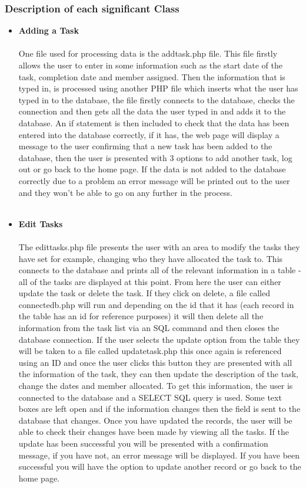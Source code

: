 \documentclass{project}
\begin{document}
\subsubsection{Description of each significant Class}
\begin{itemize}
\item \textbf{Adding a Task} \\~\\
One file used for processing data is the addtask.php file. This file firstly allows the user to enter in some information such as the start date of the task, completion date and member assigned. Then the information that is typed in, is processed using another PHP file which inserts what the user has typed in to the database, the file firstly connects to the database, checks the connection and then gets all the data the user typed in and adds it to the database. An if statement is then included to check that the data has been entered into the database correctly, if it has, the web page will display a message to the user confirming that a new task has been added to the database, then the user is presented with 3 options to add another task, log out or go back to the home page. If the data is not added to the database correctly due to a problem an error message will be printed out to the user and they won't be able to go on any further in the process. \\~\\
\item \textbf{Edit Tasks} \\~\\
The edittasks.php file presents the user with an area to modify the tasks they have set for example, changing who they have allocated the task to. This connects to the database and prints all of the relevant information in a table - all of the tasks are displayed at this point. From here the user can either update the task or delete the task. If they click on delete, a file called connectedb.php will run and depending on the id that it has (each record in the table has an id for reference purposes) it will then delete all the information from the task list via an SQL command and then closes the database connection. If the user selects the update option from the table they will be taken to a file called updatetask.php this once again is referenced using an ID and once the user clicks this button they are presented with all the information of the task, they can then update the description of the task, change the dates and member allocated.  To get this information, the user is connected to the database and a SELECT SQL query is used. Some text boxes are left open and if the information changes then the field is sent to the database that changes. Once you have updated the records, the user will be able to check their changes have been made by viewing all the tasks. If the update has been successful you will be presented with a confirmation message, if you have not, an error message will be displayed. If you have been successful you will have the option to update another record or go back to the home page. \\~\\

\end{itemize}
\end{document}
